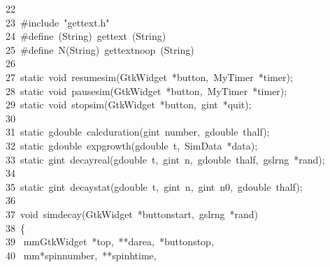 \documentclass[10pt,a4paper]{article}
\newcommand{\hlstd}[1]{\textcolor[rgb]{0,0,0}{#1}}
\newcommand{\hltyp}[1]{\textcolor[rgb]{0.51,0,0}{#1}}
\newcommand{\hldstr}[1]{\textcolor[rgb]{0.51,0.51,0}{#1}}
\newcommand{\hldir}[1]{\textcolor[rgb]{0,0.51,0}{#1}}
\newcommand{\hlline}[1]{\textcolor[rgb]{0.33,0.33,0.33}{#1}}
\begin{document}
{}\hlline{\ \ 22\ }\hldir{}\hlstd{\mbox{}\\
}\hlline{\ \ 23\ }\hlstd{}\hldir{\#include\ }\hldstr{"gettext.h"}\hldir{\mbox{}\\
}\hlline{\ \ 24\ }\hldir{}\hlstd{}\hldir{\#define\ \textunderscore (String)\ gettext\ (String)\mbox{}\\
}\hlline{\ \ 25\ }\hldir{}\hlstd{}\hldir{\#define\ N\textunderscore (String)\ gettext\textunderscore noop\ (String)\mbox{}\\
}\hlline{\ \ 26\ }\hldir{}\hlstd{\mbox{}\\
}\hlline{\ \ 27\ }\hlstd{}\hltyp{static\ void\ }\hlstd{resume\textunderscore sim(GtkWidget\ *button,\ MyTimer\ *timer);\mbox{}\\
}\hlline{\ \ 28\ }\hlstd{}\hltyp{static\ void\ }\hlstd{pause\textunderscore sim(GtkWidget\ *button,\ MyTimer\ *timer);\mbox{}\\
}\hlline{\ \ 29\ }\hlstd{}\hltyp{static\ void\ }\hlstd{stop\textunderscore sim(GtkWidget\ *button,\ gint\ *quit);\mbox{}\\
}\hlline{\ \ 30\ }\hlstd{\mbox{}\\
}\hlline{\ \ 31\ }\hlstd{}\hltyp{static\ }\hlstd{gdouble\ calc\textunderscore duration(gint\ number,\ gdouble\ thalf);\mbox{}\\
}\hlline{\ \ 32\ }\hlstd{}\hltyp{static\ }\hlstd{gdouble\ exp\textunderscore growth(gdouble\ t,\ SimData\ *data);\mbox{}\\
}\hlline{\ \ 33\ }\hlstd{}\hltyp{static\ }\hlstd{gint\ decay\textunderscore real(gdouble\ t,\ gint\ n,\ gdouble\ thalf,\ gsl\textunderscore rng\ *rand);\mbox{}\\
}\hlline{\ \ 34\ }\hlstd{\mbox{}\\
}\hlline{\ \ 35\ }\hlstd{}\hltyp{static\ }\hlstd{gint\ decay\textunderscore stat(gdouble\ t,\ gint\ n,\ gint\ n0,\ gdouble\ thalf);\mbox{}\\
}\hlline{\ \ 36\ }\hlstd{\mbox{}\\
}\hlline{\ \ 37\ }\hlstd{}\hltyp{void\ }\hlstd{sim\textunderscore decay(GtkWidget\ *button\textunderscore start,\ gsl\textunderscore rng\ *rand)\mbox{}\\
}\hlline{\ \ 38\ }\hlstd{\{\mbox{}\\
}\hlline{\ \ 39\ }\hlstd{\hlstd{ mm}GtkWidget\ *top,\ **darea,\ *button\textunderscore stop,\mbox{}\\
}\hlline{\ \ 40\ }\hlstd{\hlstd{ mm}*spin\textunderscore number,\ **spin\textunderscore htime,\mbox{}\\
}
\end{document}
